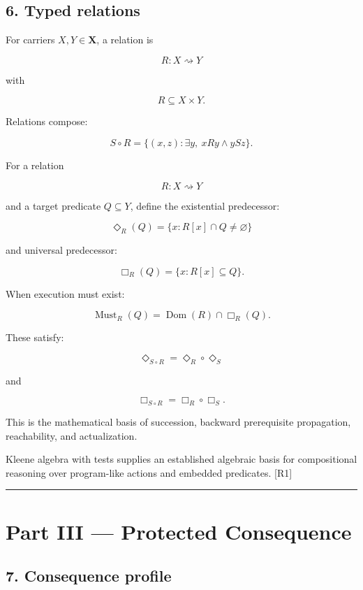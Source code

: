 \documentclass[
]{article}
\begin{document}
\subsection{6. Typed relations}\label{typed-relations}

For carriers \(X,Y\in\mathbf X\), a relation is

\[
R:X\rightsquigarrow Y
\]

with

\[
R\subseteq X\times Y.
\]

Relations compose:

\[
S\circ R
=
\{(x,z):\exists y,\ xRy\land ySz\}.
\]

For a relation

\[
R:X\rightsquigarrow Y
\]

and a target predicate \(Q\subseteq Y\), define the existential
predecessor:

\[
\boxed{
\Diamond_R(Q)
=
\{x:R[x]\cap Q\neq\varnothing\}
}
\]

and universal predecessor:

\[
\boxed{
\Box_R(Q)
=
\{x:R[x]\subseteq Q\}.
}
\]

When execution must exist:

\[
\boxed{
\operatorname{Must}_R(Q)
=
\operatorname{Dom}(R)\cap\Box_R(Q).
}
\]

These satisfy:

\[
\Diamond_{S\circ R}
=
\Diamond_R\circ\Diamond_S
\]

and

\[
\Box_{S\circ R}
=
\Box_R\circ\Box_S.
\]

This is the mathematical basis of succession, backward prerequisite
propagation, reachability, and actualization.

Kleene algebra with tests supplies an established algebraic basis for
compositional reasoning over program-like actions and embedded
predicates. {[}R1{]}

\begin{center}\rule{0.5\linewidth}{0.5pt}\end{center}

\section{Part III --- Protected
Consequence}\label{part-iii-protected-consequence}

\subsection{7. Consequence profile}\label{consequence-profile}
\end{document}
